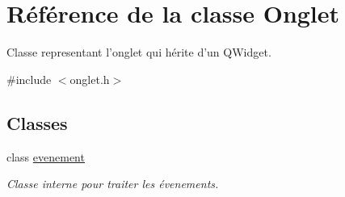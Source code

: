 \hypertarget{class_onglet}{\section{Référence de la classe Onglet}
\label{class_onglet}
}


Classe representant l'onglet qui hérite d'un Q\-Widget.  




{\ttfamily \#include $<$onglet.\-h$>$}

\subsection*{Classes}
\begin{DoxyCompactItemize}
\item 
class \hyperlink{class_onglet_1_1evenement}{evenement}
\begin{DoxyCompactList}\small\item\em Classe interne pour traiter les évenements. \end{DoxyCompactList}\end{DoxyCompactItemize}
